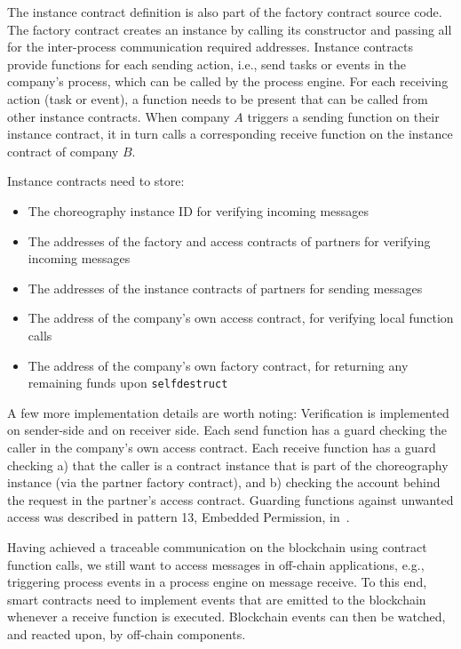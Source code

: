 \documentclass[runningheads]{llncs}
\begin{document}
The instance contract definition is also part of the factory contract source code.
The factory contract creates an instance by calling its constructor and passing all for the inter-process communication required addresses.
Instance contracts provide functions for each sending action, i.e., send tasks or events in the company's process, which can be called by the process engine.
For each receiving action (task or event), a function needs to be present that can be called from other instance contracts.
When company $A$ triggers a sending function on their instance contract, it in turn calls a corresponding receive function on the instance contract of company $B$.

Instance contracts need to store:
\begin{itemize}
	\item The choreography instance ID for verifying incoming messages
	\item The addresses of the factory and access contracts of partners for verifying incoming messages
	\item The addresses of the instance contracts of partners for sending messages
	\item The address of the company's own access contract, for verifying local function calls
	\item The address of the company's own factory contract, for returning any remaining funds upon \texttt{selfdestruct}
\end{itemize}

A few more implementation details are worth noting:
Verification is implemented on sender-side and on receiver side.
Each send function has a guard checking the caller in the company's own access contract.
Each receive function has a guard checking a) that the caller is a contract instance that is part of the choreography instance (via the partner factory contract), and b) checking the account behind the request in the partner's access contract.
Guarding functions against unwanted access was described in pattern 13, Embedded Permission, in~\cite{xu2018pattern}.

Having achieved a traceable communication on the blockchain using contract function calls, we still want to access messages in off-chain applications, e.g., triggering process events in a process engine on message receive.
To this end, smart contracts need to implement events that are emitted to the blockchain whenever a receive function is executed.
Blockchain events can then be watched, and reacted upon, by off-chain components.
\end{document}
